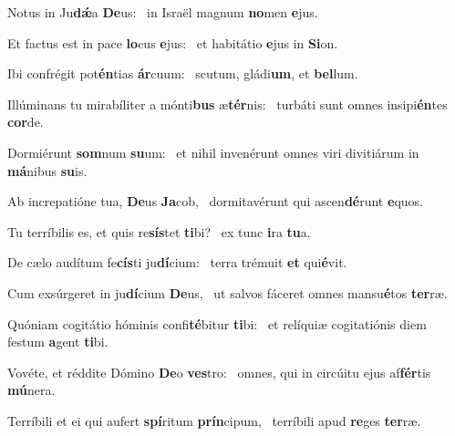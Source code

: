 \item Notus in Ju\textbf{dǽ}a \textbf{De}us:~\psstar{} in Israël magnum \textbf{no}men \textbf{e}jus.
\item Et factus est in pace \textbf{lo}cus \textbf{e}jus:~\psstar{} et habitátio \textbf{e}jus in \textbf{Si}on.
\item Ibi confrégit pot\textbf{én}tias \textbf{ár}cuum:~\psstar{} scutum, gládi\textbf{um}, et \textbf{bel}lum.
\item Illúminans tu mirabíliter a mónti\textbf{bus} æ\textbf{tér}nis:~\psstar{} turbáti sunt omnes insipi\textbf{én}tes \textbf{cor}de.
\item Dormiérunt \textbf{som}num \textbf{su}um:~\psstar{} et nihil invenérunt omnes viri divitiárum in \textbf{má}nibus \textbf{su}is.
\item Ab increpatióne tua, \textbf{De}us \textbf{Ja}cob,~\psstar{} dormitavérunt qui a\-scen\textbf{dé}runt \textbf{e}quos.
\item Tu terríbilis es, et quis re\textbf{sís}tet \textbf{ti}bi?~\psstar{} ex tunc \textbf{i}ra \textbf{tu}a.
\item De cælo audítum fe\textbf{cís}ti ju\textbf{dí}cium:~\psstar{} terra trémuit \textbf{et} qui\textbf{é}vit.
\item Cum exsúrgeret in ju\textbf{dí}cium \textbf{De}us,~\psstar{} ut salvos fáceret omnes mansu\textbf{é}tos \textbf{ter}ræ.
\item Quóniam cogitátio hóminis confi\textbf{té}bitur \textbf{ti}bi:~\psstar{} et relíquiæ cogitatiónis diem festum \textbf{a}gent \textbf{ti}bi.
\item Vovéte, et réddite Dómino \textbf{De}o \textbf{ves}tro:~\psstar{} omnes, qui in circúitu ejus af\textbf{fér}tis \textbf{mú}nera.
\item Terríbili et ei qui aufert \textbf{spí}ritum \textbf{prín}cipum,~\psstar{} terríbili apud \textbf{re}ges \textbf{ter}ræ.

